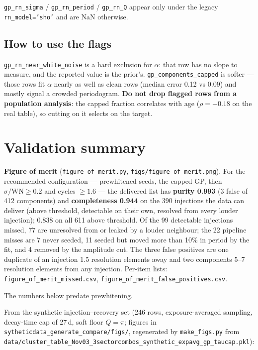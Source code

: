 \documentclass[11pt]{article}
\newcommand{\code}[1]{\texttt{#1}}
\begin{document}
\code{gp\_rn\_sigma} / \code{gp\_rn\_period} / \code{gp\_rn\_Q} appear only under the legacy
\code{rn\_model='sho'} and are NaN otherwise.

\subsection{How to use the flags}

\code{gp\_rn\_near\_white\_noise} is a hard exclusion for $\alpha$: that row has no slope to
measure, and the reported value is the prior's. \code{gp\_components\_capped} is softer ---
those rows fit $\alpha$ nearly as well as clean rows (median error 0.12 vs 0.09) and mostly
signal a crowded periodogram. \textbf{Do not drop flagged rows from a population analysis}:
the capped fraction correlates with age ($\rho = -0.18$ on the real table), so cutting on it
selects on the target.

\section{Validation summary}

\textbf{Figure of merit} (\code{figure\_of\_merit.py}, \code{figs/figure\_of\_merit.png}). For the
recommended configuration --- prewhitened seeds, the capped GP, then
$\sigma/\mathrm{WN} \ge 0.2$ and cycles $\ge 1.6$ --- the delivered list has \textbf{purity 0.993}
(3 false of 412 components) and \textbf{completeness 0.944} on the 390 injections the data can
deliver (above threshold, detectable on their own, resolved from every louder injection);
0.838 on all 611 above threshold. Of the 99 detectable injections missed, 77 are unresolved
from or leaked by a louder neighbour; the 22 pipeline misses are 7 never seeded, 11 seeded
but moved more than 10\% in period by the fit, and 4 removed by the amplitude cut. The three
false positives are one duplicate of an injection 1.5 resolution elements away and two
components 5--7 resolution elements from any injection. Per-item lists:
\code{figure\_of\_merit\_missed.csv}, \code{figure\_of\_merit\_false\_positives.csv}.

The numbers below predate prewhitening.

From the synthetic injection--recovery set (246 rows, exposure-averaged sampling, decay-time
cap of 27\,d, soft floor $Q = \pi$; figures in \code{sytheticdata\_generate\_compare/figs/},
regenerated by \code{make\_figs.py} from
\code{data/cluster\_table\_Nov03\_3sectorcombos\_synthetic\_expavg\_gp\_taucap.pkl}):
\end{document}
